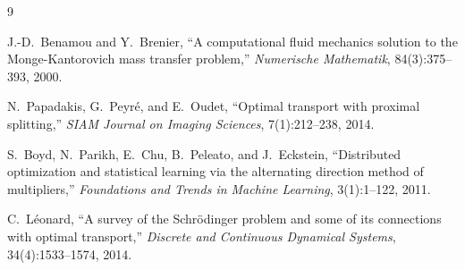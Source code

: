 \documentclass[11pt]{article}
\begin{document}
\begin{thebibliography}{9}

  J.-D.\ Benamou and Y.\ Brenier,
  ``A computational fluid mechanics solution to the Monge-Kantorovich
  mass transfer problem,''
  \textit{Numerische Mathematik}, 84(3):375--393, 2000.

  N.\ Papadakis, G.\ Peyr\'{e}, and E.\ Oudet,
  ``Optimal transport with proximal splitting,''
  \textit{SIAM Journal on Imaging Sciences}, 7(1):212--238, 2014.

  S.\ Boyd, N.\ Parikh, E.\ Chu, B.\ Peleato, and J.\ Eckstein,
  ``Distributed optimization and statistical learning via the alternating
  direction method of multipliers,''
  \textit{Foundations and Trends in Machine Learning}, 3(1):1--122, 2011.

  C.\ L\'{e}onard,
  ``A survey of the Schr\"{o}dinger problem and some of its connections
  with optimal transport,''
  \textit{Discrete and Continuous Dynamical Systems}, 34(4):1533--1574, 2014.

\end{thebibliography}
\end{document}
